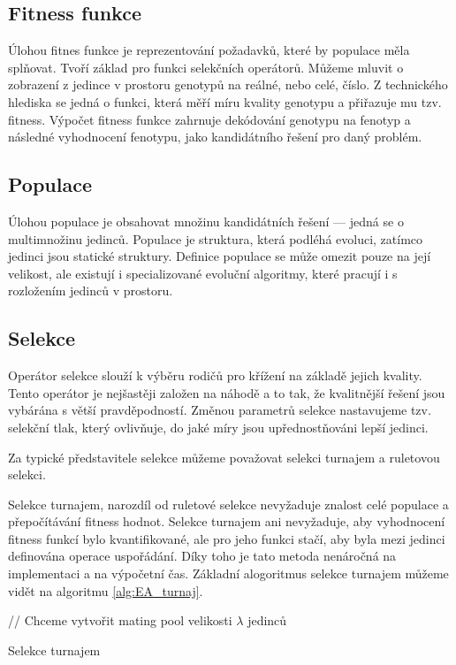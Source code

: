 \subsection{Fitness funkce}
Úlohou fitnes funkce je reprezentování požadavků, které by populace měla splňovat.
Tvoří základ pro funkci selekčních operátorů.
Můžeme mluvit o zobrazení z jedince v prostoru genotypů na reálné, nebo celé, číslo.
Z technického hlediska se jedná o funkci, která měří míru kvality genotypu a přiřazuje mu tzv. fitness.
Výpočet fitness funkce zahrnuje dekódování genotypu na fenotyp a následné vyhodnocení fenotypu, jako kandidátního řešení pro daný problém.

\subsection{Populace}
Úlohou populace je obsahovat množinu kandidátních řešení --- jedná se o multimnožinu jedinců.
Populace je struktura, která podléhá evoluci, zatímco jedinci jsou statické struktury.
Definice populace se může omezit pouze na její velikost, ale existují i specializované evoluční algoritmy, které pracují i s rozložením jedinců v prostoru.


\subsection{Selekce}
Operátor selekce slouží k výběru rodičů pro křížení na základě jejich kvality.
Tento operátor je nejšastěji založen na náhodě a to tak, že kvalitnější řešení jsou vybárána s větší pravděpodností.
Změnou parametrů selekce nastavujeme tzv. selekční tlak, který ovlivňuje, do jaké míry jsou upřednostňováni lepší jedinci.

Za typické představitele selekce můžeme považovat selekci turnajem a ruletovou selekci.

Selekce turnajem, narozdíl od ruletové selekce nevyžaduje znalost celé populace a přepočítávání fitness hodnot.
Selekce turnajem ani nevyžaduje, aby vyhodnocení fitness funkcí bylo kvantifikované, ale pro jeho funkci stačí, aby byla mezi jedinci definována operace uspořádání.
Díky toho je tato metoda nenáročná na implementaci a na výpočetní čas.
Základní alogoritmus selekce turnajem můžeme vidět na algoritmu \ref{alg:EA_turnaj}.

\begin{algorithm}[H]
    // Chceme vytvořit mating pool velikosti $\lambda$ jedinců\;
    \caption{Selekce turnajem}
    \label{alg:EA_turnaj}
\end{algorithm}

